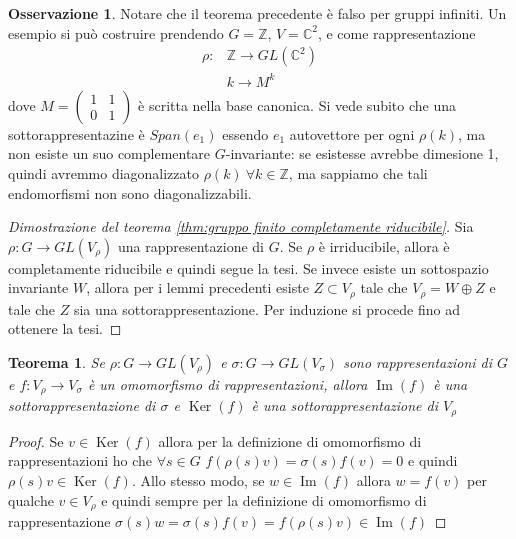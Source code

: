 \documentclass[11pt]{article}
\theoremstyle{plain}
\newtheorem{thm}{Teorema}[section]
\theoremstyle{definition}
\newtheorem*{rem}{Osservazione}
\theoremstyle{remark}
\newcommand{\C}{\mathbb{C}}
\newcommand{\Z}{\mathbb{Z}}
\DeclareMathOperator{\Ker}{Ker}
\DeclareMathOperator{\Imm}{Im}
\begin{document}
\begin{rem} Notare che il teorema precedente è falso per gruppi infiniti. Un esempio si può costruire prendendo $G=\Z$, $V=\C^2$, e come rappresentazione
\begin{align*}
	\rho:&\Z\to GL(\C^2)\\
	&k\to M^k
\end{align*}
dove $M=\begin{pmatrix}
        	1 & 1\\
        	0 & 1
        \end{pmatrix}$ è scritta nella base canonica.\newline
Si vede subito che una sottorappresentazine è $Span(e_1)$ essendo $e_1$ autovettore per ogni $\rho(k)$, ma non esiste un suo complementare $G$-invariante: se esistesse avrebbe dimesione 1, quindi avremmo diagonalizzato $\rho(k)\ \forall k\in \Z$, ma sappiamo che tali endomorfismi non sono diagonalizzabili. 
\end{rem}


\begin{proof}[Dimostrazione del teorema \ref{thm:gruppo finito completamente riducibile}]
Sia $\rho: G \to GL(V_\rho)$ una rappresentazione di $G$. Se $\rho$ è irriducibile, allora è completamente riducibile e quindi segue la tesi. Se invece esiste un sottospazio invariante $W$, allora per i lemmi precedenti esiste $Z \subset V_\rho$ tale che $V_\rho = W \oplus Z$ e tale che $Z$ sia una sottorappresentazione. Per induzione si procede fino ad ottenere la tesi. %
\end{proof}




\begin{thm} Se $\rho: G \to GL(V_\rho)$ e $\sigma: G \to GL(V_\sigma)$ sono rappresentazioni di $G$ e $f: V_\rho \to V_\sigma$ è un omomorfismo di rappresentazioni, allora $\Imm(f)$ è una sottorappresentazione di $\sigma$ e $\Ker(f)$ è una sottorappresentazione di $V_\rho$
\end{thm}
\begin{proof}
Se $v\in \Ker(f)$ allora per la definizione di omomorfismo di rappresentazioni ho che $\forall s\in G$ $f(\rho(s)v)=\sigma(s)f(v)=0$ e quindi $\rho(s)v\in \Ker(f)$. Allo stesso modo, se $w\in \Imm(f)$ allora $w=f(v)$ per qualche $v\in V_\rho$ e quindi sempre per la definizione di omomorfismo di rappresentazione $\sigma(s)w=\sigma(s)f(v)=f(\rho(s)v)\in \Imm(f)$
\end{proof}
\end{document}
